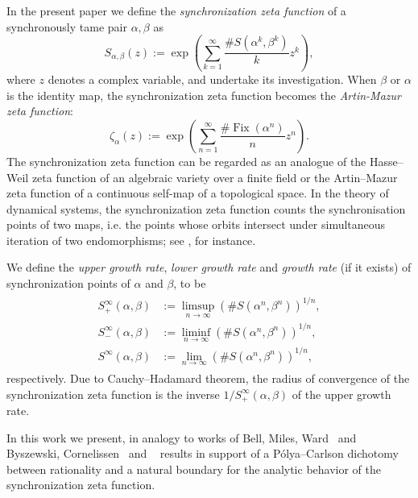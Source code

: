 \documentclass[oneside]{amsart}
\def\Fix{\operatorname{Fix}}
\begin{document}
In the present paper we define the \emph{synchronization zeta function} of a synchronously tame pair $\alpha, \beta$ as
\begin{equation*} %
  S_{\alpha, \beta}(z) := \exp \left( \sum_{k=1}^\infty \frac{\# S(\alpha^k, \beta^k)}{k} z^k \right),
\end{equation*}
where $z$ denotes a complex variable, and undertake its investigation.
When $\beta$ or $\alpha$ is the identity map, the synchronization zeta function becomes
the \emph{Artin-Mazur zeta function}:
\begin{equation*}
  \zeta_\alpha(z) := \exp \left( \sum_{n=1}^\infty \frac{\# \Fix(\alpha^n)}{n} z^n \right).
\end{equation*}
The synchronization zeta function can be
regarded as an analogue of the Hasse--Weil zeta function of an
algebraic variety over a finite field or the Artin--Mazur zeta
function of a continuous self-map of a topological space.
In the theory of dynamical systems, the synchronization zeta
function counts the synchronisation points of two maps, i.e. the
points whose orbits intersect under simultaneous iteration of two
endomorphisms; see \cite{Miles13}, for instance.

We define the \emph{upper growth rate}, \emph{lower growth rate}
and \emph{growth rate} (if it exists) of synchronization points of $\alpha$ and $\beta$, to be
\begin{align*} %
\begin{split}
  S^\infty_+(\alpha, \beta) &:= \limsup_{n \to \infty} \left(\# S(\alpha^n, \beta^n) \right)^{1/n}, \\
  S^\infty_-(\alpha, \beta) &:= \liminf_{n \to \infty} \left( \# S(\alpha^n, \beta^n) \right)^{1/n}, \\
  S^\infty(\alpha, \beta) &:= \lim_{n \to \infty} \left( \# S(\alpha^n, \beta^n) \right)^{1/n},
\end{split}
\end{align*}
respectively.
Due to Cauchy--Hadamard theorem, the radius of convergence of the synchronization zeta function
is the inverse $1/S^\infty_+(\alpha,\beta)$ of the upper growth rate.

In this work  we present, in analogy to works of
Bell, Miles, Ward~\cite{BMW} and Byszewski, Cornelissen~\cite[\S
5]{ByCo18} and ~\cite{FelsKlop} results in support of a P\'olya--Carlson dichotomy between
rationality and a natural boundary for the analytic behavior of the
synchronization  zeta function.
\end{document}
